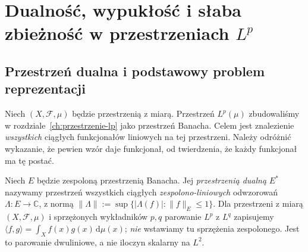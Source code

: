 \chapter[Dualność i geometria przestrzeni \texorpdfstring{$L^p$}{L\string^p}]{Dualność, wypukłość i słaba zbieżność w przestrzeniach \texorpdfstring{$L^p$}{L\string^p}}
\label{ch:dualnosc-lp}

\providecommand{\atlasref}[2]{#2}


\section{Przestrzeń dualna i podstawowy problem reprezentacji}
Niech $(X,\mathcal F,\mu)$ będzie przestrzenią z miarą. Przestrzeń
$L^p(\mu)$ zbudowaliśmy w rozdziale~\ref{ch:przestrzenie-lp} jako
przestrzeń Banacha. Celem jest znalezienie \emph{wszystkich} ciągłych
funkcjonałów liniowych na tej przestrzeni. Należy odróżnić
wykazanie, że pewien wzór daje funkcjonał, od twierdzenia, że
każdy funkcjonał ma tę postać.

\begin{definicja}
\label{def:dual-lp-15}
Niech $E$ będzie zespoloną przestrzenią Banacha.
Jej \emph{przestrzenią dualną} $E^*$ nazywamy przestrzeń
wszystkich ciągłych \emph{zespolono-liniowych}
odwzorowań $\Lambda:E\to\mathbb C$, z normą
$\|\Lambda\|:=\sup\{|\Lambda(f)|:\|f\|_E\le1\}$.
Dla przestrzeni z miarą $(X,\mathcal F,\mu)$ i
sprzężonych wykładników $p,q$ parowanie $L^p$ z $L^q$
zapisujemy
$\langle f,g\rangle=\int_X f(x)g(x)\,\mathrm d\mu(x)$;
\emph{nie} wstawiamy tu sprzężenia zespolonego. Jest to parowanie
dwuliniowe, a nie iloczyn skalarny na $L^2$.
\end{definicja}

